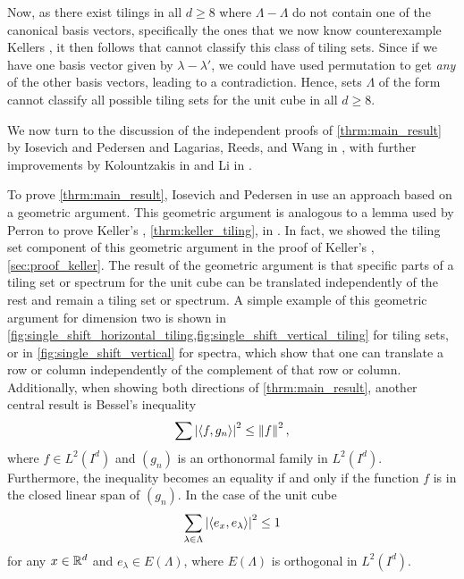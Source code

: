 \documentclass[../thesis.tex]{subfiles}
\begin{document}
Now, as there exist tilings in all $d\geq8$ where $\Lambda-\Lambda$ do not contain one of the canonical basis vectors, specifically the ones that we now know counterexample Kellers , it then follows that  cannot classify this class of tiling sets. Since if we have one basis vector given by $\lambda-\lambda'$, we could have used permutation to get \emph{any} of the other basis vectors, leading to a contradiction. Hence, sets $\Lambda$ of the form  cannot classify all possible tiling sets for the unit cube in all $d\geq8$. 

We now turn to the discussion of the independent proofs of \cref{thrm:main_result} by Iosevich and Pedersen \cite{iosevichSpectralTilingProperties1998} and Lagarias, Reeds, and Wang in \cite{lagariasOrthonormalBasesExponentials2000}, with further improvements by Kolountzakis in \cite{kolountzakisPackingTilingOrthogonality2000} and Li in \cite{liCharacterizationsSpectraTilings2004}. 

To prove \cref{thrm:main_result}, Iosevich and Pedersen in \cite{iosevichSpectralTilingProperties1998} use an approach based on a geometric argument. This geometric argument is analogous to a lemma used by Perron to prove Keller's , \cref{thrm:keller_tiling}, in \cite{perronUeberLueckenloseAusfuellung1940}. In fact, we showed the tiling set component of this geometric argument in the proof of Keller's , \cref{sec:proof_keller}. The result of the geometric argument is that specific parts of a tiling set or spectrum for the unit cube can be translated independently of the rest and remain a tiling set or spectrum. A simple example of this geometric argument for dimension two is shown in \cref{fig:single_shift_horizontal_tiling,fig:single_shift_vertical_tiling} for tiling sets, or in \cref{fig:single_shift_vertical} for spectra, which show that one can translate a row or column independently of the complement of that row or column. Additionally, when showing both directions of \cref{thrm:main_result}, another central result is Bessel's inequality
\begin{equation*}%
    \sum\bralMed{\braaMed{f,g_n}}^2 \leq \branMed{f}^2,
\end{equation*}
where $f\in L^2(I^d)$ and $(g_n)$ is an orthonormal family in $L^2(I^d)$. Furthermore, the inequality becomes an equality if and only if the function $f$ is in the closed linear span of $(g_n)$. In the case of the unit cube
\begin{equation*}
    \sum_{\lambda \in \Lambda} \left|\left \langle e_x,e_\lambda \right \rangle\right|^2 \leq 1
\end{equation*}
for any $x\in \mathbb{R}^d$ and $e_\lambda\in E(\Lambda)$, where $E(\Lambda)$ is orthogonal in $L^2(I^d)$.
\end{document}
